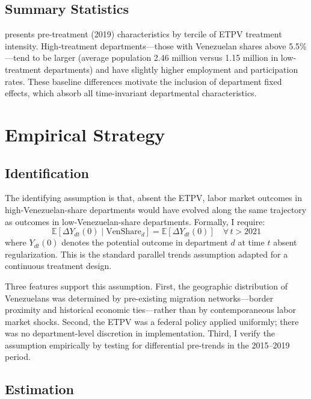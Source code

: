 \documentclass[12pt]{article}
\newcommand{\E}{\mathbb{E}}
\begin{document}
\subsection{Summary Statistics}

 presents pre-treatment (2019) characteristics by tercile of ETPV treatment intensity. High-treatment departments---those with Venezuelan shares above 5.5\%---tend to be larger (average population 2.46 million versus 1.15 million in low-treatment departments) and have slightly higher employment and participation rates. These baseline differences motivate the inclusion of department fixed effects, which absorb all time-invariant departmental characteristics.



\section{Empirical Strategy}

\subsection{Identification}

The identifying assumption is that, absent the ETPV, labor market outcomes in high-Venezuelan-share departments would have evolved along the same trajectory as outcomes in low-Venezuelan-share departments. Formally, I require:
\begin{equation}
\E\left[\Delta Y_{dt}(0) \mid \text{VenShare}_d\right] = \E\left[\Delta Y_{dt}(0)\right] \quad \forall\, t > 2021
\label{eq:parallel}
\end{equation}
where $Y_{dt}(0)$ denotes the potential outcome in department $d$ at time $t$ absent regularization. This is the standard parallel trends assumption adapted for a continuous treatment design.

Three features support this assumption. First, the geographic distribution of Venezuelans was determined by pre-existing migration networks---border proximity and historical economic ties---rather than by contemporaneous labor market shocks. Second, the ETPV was a federal policy applied uniformly; there was no department-level discretion in implementation. Third, I verify the assumption empirically by testing for differential pre-trends in the 2015--2019 period.

\subsection{Estimation}
\end{document}
